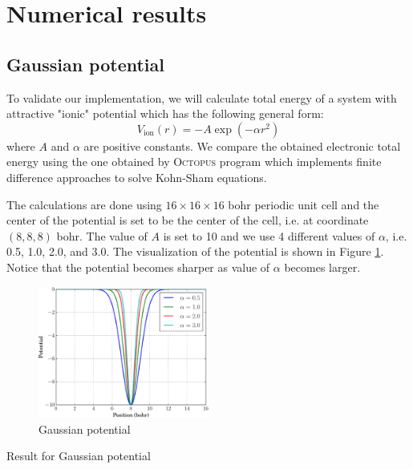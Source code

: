 \section{Numerical results}

\subsection{Gaussian potential}

To validate our implementation, we will calculate total energy of a system with
attractive "ionic" potential which has the following general form:
\begin{equation}
V_{\mathrm{ion}}(r) = -A\exp(-\alpha r^2)
\end{equation}
where $A$ and $\alpha$ are positive constants.
We compare the obtained electronic total energy using the one obtained by
\textsc{Octopus} program \cite{Marques2003,Castro2006,Xavier2015}
which implements finite difference approaches to solve Kohn-Sham equations.
 
The calculations are done using $16 \times 16 \times 16$ bohr periodic unit cell
and the center of the potential is set to be the center of the cell, i.e.
at coordinate $(8,8,8)$ bohr. The value of $A$ is set to 10 and we use 4 different
values of $\alpha$, i.e. 0.5, 1.0, 2.0, and 3.0. The visualization of the potential
is shown in Figure \ref{fig:gauss_pot}. Notice that the potential becomes sharper
as value of $\alpha$ becomes larger.
\begin{figure}
\includegraphics[width=0.5\textwidth]{images/V_gauss.pdf}
\caption{Gaussian potential}
\label{fig:gauss_pot}
\end{figure}

Result for Gaussian potential


